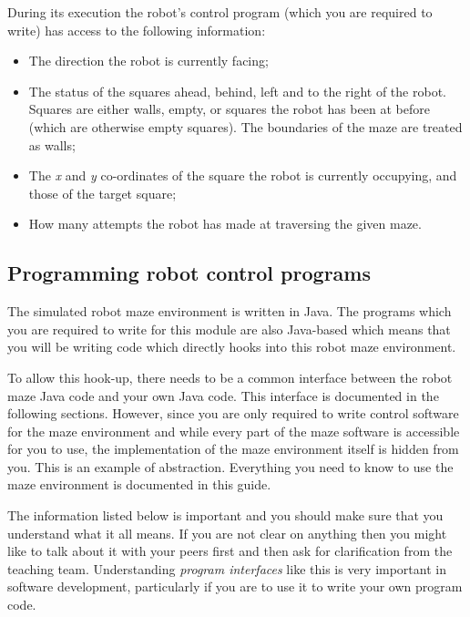 During its execution the robot's control program (which you are required to
write) has access to the following information:

\begin{itemize}

\item The direction the robot is currently facing;

\item The status of the squares ahead, behind, left and to the right of the robot. Squares are either walls, empty, or squares the robot has been at before (which are otherwise empty squares). The boundaries of the maze are treated as walls;

\item The {\it x} and {\it y} co-ordinates of the square the robot is currently occupying, and those of the target square;

\item How many attempts the robot has made at traversing the given maze.
\end{itemize}

\subsection{Programming robot control programs}

The simulated robot maze environment is written in Java. The programs which you are required to write for this module are also Java-based which means that you will be writing code which directly hooks into this robot maze environment. 

To allow this hook-up, there needs to be a common interface between the robot maze Java code and your own Java code. This interface is documented in the following sections. However, since you are only required to write control software for the maze environment and while every part of the maze software is accessible for you to use, the implementation of the maze environment itself is hidden from you. This is an example of abstraction. Everything you need to know to use the maze environment is documented in this guide.

The information listed below is important and you should make sure that you understand what it all means. If you are not clear on anything then you might like to talk about it with your peers first and then ask for clarification from the teaching team. Understanding \emph{program interfaces} like this is very important in software development, particularly if you are to use it to write your own program code.

